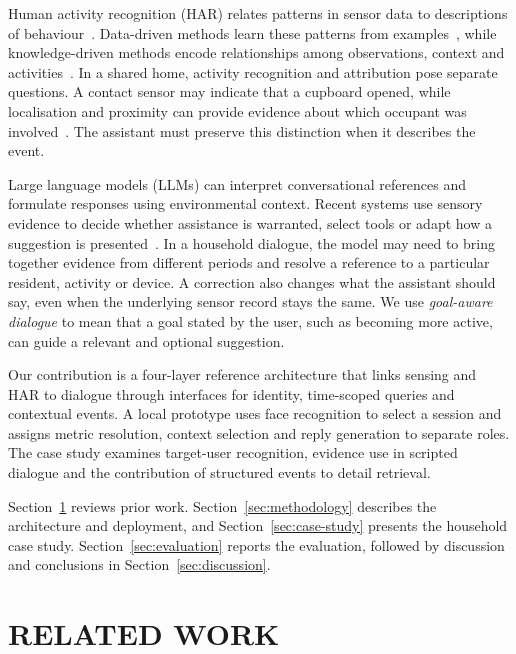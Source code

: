 \documentclass[a4paper,twoside]{article}
\begin{document}
Human activity recognition (HAR) relates patterns in sensor data to descriptions of behaviour~\cite{bulling2014tutorial}. Data-driven methods learn these patterns from examples~\cite{ordonez2016deep}, while knowledge-driven methods encode relationships among observations, context and activities~\cite{polo2025health}. In a shared home, activity recognition and attribution pose separate questions. A contact sensor may indicate that a cupboard opened, while localisation and proximity can provide evidence about which occupant was involved~\cite{poloMultiOccupancy,polo2024social}. The assistant must preserve this distinction when it describes the event.

Large language models (LLMs) can interpret conversational references and formulate responses using environmental context. Recent systems use sensory evidence to decide whether assistance is warranted, select tools or adapt how a suggestion is presented~\cite{yin2025harmony,yang2025contextagent,yang2026proagent,lee2025sensible}. In a household dialogue, the model may need to bring together evidence from different periods and resolve a reference to a particular resident, activity or device. A correction also changes what the assistant should say, even when the underlying sensor record stays the same. We use \emph{goal-aware dialogue} to mean that a goal stated by the user, such as becoming more active, can guide a relevant and optional suggestion.

Our contribution is a four-layer reference architecture that links sensing and HAR to dialogue through interfaces for identity, time-scoped queries and contextual events. A local prototype uses face recognition to select a session and assigns metric resolution, context selection and reply generation to separate roles. The case study examines target-user recognition, evidence use in scripted dialogue and the contribution of structured events to detail retrieval.

Section~\ref{sec:related} reviews prior work. Section~\ref{sec:methodology} describes the architecture and deployment, and Section~\ref{sec:case-study} presents the household case study. Section~\ref{sec:evaluation} reports the evaluation, followed by discussion and conclusions in Section~\ref{sec:discussion}.

\section{\uppercase{Related Work}}
\label{sec:related}
\end{document}
